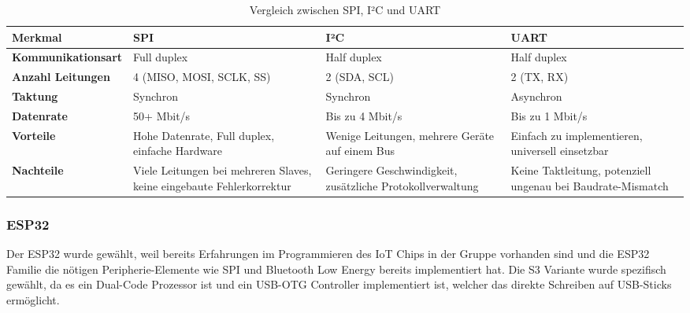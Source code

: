 \begin{table}[ht]
\renewcommand{\arraystretch}{1.5} %
\centering
\begin{tabular}{@{}p{3.4cm}p{3.2cm}p{3.2cm}p{3.2cm}@{}}
\toprule
\textbf{Merkmal}        & \textbf{SPI} & \textbf{I²C} & \textbf{UART} \\ \midrule
\textbf{Kommunikationsart} & Full duplex & Half duplex & Half duplex \\
\textbf{Anzahl Leitungen} & 4 (MISO, MOSI, SCLK, SS) & 2 (SDA, SCL) & 2 (TX, RX) \\
\textbf{Taktung}        & Synchron & Synchron & Asynchron \\
\textbf{Datenrate}      & 50+ Mbit/s & Bis zu 4 Mbit/s & Bis zu 1 Mbit/s \\
\textbf{Vorteile}       & Hohe Datenrate, Full duplex, einfache Hardware & Wenige Leitungen, mehrere Geräte auf einem Bus & Einfach zu implementieren, universell einsetzbar \\
\textbf{Nachteile}      & Viele Leitungen bei mehreren Slaves, keine eingebaute Fehlerkorrektur & Geringere Geschwindigkeit, zusätzliche Protokollverwaltung & Keine Taktleitung, potenziell ungenau bei Baudrate-Mismatch \\
\bottomrule
\end{tabular}
\caption{Vergleich zwischen SPI, I²C und UART}
\label{tab:spi_vergleich}
\end{table}

\subsubsection{ESP32}
Der ESP32 wurde gewählt, weil bereits Erfahrungen im Programmieren des IoT Chips in der Gruppe vorhanden sind und die ESP32 Familie die nötigen Peripherie-Elemente wie SPI und Bluetooth Low Energy bereits implementiert hat. Die S3 Variante wurde spezifisch gewählt, da es ein Dual-Code Prozessor ist und ein USB-OTG Controller implementiert ist, welcher das direkte Schreiben auf USB-Sticks ermöglicht. 

